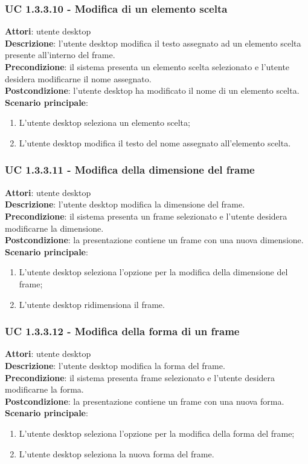 \subsubsection{UC 1.3.3.10 - Modifica di un elemento scelta}{
	\label{uc1.3.3.10}
	\textbf{Attori}: utente desktop \\
	\textbf{Descrizione}: l'utente desktop modifica il testo assegnato ad un elemento scelta presente all'interno del frame. \\
	\textbf{Precondizione}: il sistema presenta un elemento scelta selezionato e l'utente desidera modificarne il nome assegnato.	\\
	\textbf{Postcondizione}: l'utente desktop ha modificato il nome di un elemento scelta.	\\
	\textbf{Scenario principale}:
	\begin{enumerate}
		\item L'utente desktop seleziona un elemento scelta;
		\item L'utente desktop modifica il testo del nome assegnato all'elemento scelta.
	\end{enumerate}
	}
\subsubsection{UC 1.3.3.11 - Modifica della dimensione del frame}{
	\label{uc1.3.3.11}
	\textbf{Attori}: utente desktop \\
	\textbf{Descrizione}: l'utente desktop modifica la dimensione del frame. \\
	\textbf{Precondizione}: il sistema presenta un frame selezionato e l'utente desidera modificarne la dimensione.	\\
	\textbf{Postcondizione}: la presentazione contiene un frame con una nuova dimensione.	\\
	\textbf{Scenario principale}:
	\begin{enumerate}
		\item L'utente desktop seleziona l'opzione per la modifica della dimensione del frame;
		\item L'utente desktop ridimensiona il frame.
	\end{enumerate}
	}
\subsubsection{UC 1.3.3.12 - Modifica della forma di un frame}{
	\label{uc1.3.3.12}
	\textbf{Attori}: utente desktop \\
	\textbf{Descrizione}: l'utente desktop modifica la forma del frame. \\
	\textbf{Precondizione}: il sistema presenta frame selezionato e l'utente desidera modificarne la forma.	\\
	\textbf{Postcondizione}: la presentazione contiene un frame con una nuova forma.	\\
	\textbf{Scenario principale}:
	\begin{enumerate}
		\item L'utente desktop seleziona l'opzione per la modifica della forma del frame;
		\item L'utente desktop seleziona la nuova forma del frame.
	\end{enumerate}
	}
